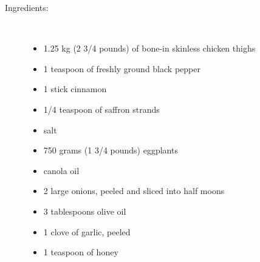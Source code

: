\documentclass[11pt,letterpaper]{article}
\begin{document}
\begin{description}

\item[Ingredients:]\ \\
	\begin{itemize}
	\item 1.25 kg (2 3/4 pounds) of bone-in skinless chicken thighs 
	\item 1 teaspoon of freshly ground black pepper
	\item 1 stick cinnamon
	\item 1/4 teaspoon of saffron strands
	\item salt
	\item 750 grams (1 3/4 pounds) eggplants 
	\item canola oil
	\item 2 large onions, peeled and sliced into half moons
	\item 3 tablespoons olive oil
	\item 1 clove of garlic, peeled 
	\item 1 teaspoon of honey
	\end{itemize}


\end{description}
\end{document}
